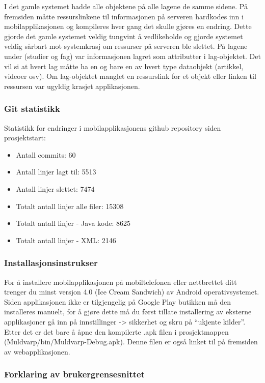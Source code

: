 \documentclass[../main.tex]{subfiles}
\begin{document}
I det gamle systemet hadde alle objektene på alle lagene de samme sidene. På fremsiden måtte ressurslinkene til informasjonen på serveren hardkodes inn i mobilapplikasjonen og kompileres hver gang det skulle gjøres en endring. Dette gjorde det gamle systemet veldig tungvint å vedlikeholde og gjorde systemet veldig sårbart mot systemkrasj om ressurser på serveren ble slettet. På lagene under (studier og fag) var informasjonen lagret som attributter i lag-objektet. Det vil si at hvert lag måtte ha en og bare en av hvert type dataobjekt (artikkel, videoer osv). Om lag-objektet manglet en ressurslink for et objekt eller linken til ressursen var ugyldig krasjet applikasjonen.

\subsubsection{Git statistikk}

Statistikk for endringer i mobilapplikasjonens github repository siden prosjektstart:
\begin{itemize}
\item Antall commits: 60
\item Antall linjer lagt til: 5513
\item Antall linjer slettet: 7474
\item Totalt antall linjer alle filer: 15308
\item Totalt antall linjer - Java kode: 8625
\item Totalt antall linjer - XML: 2146
\end{itemize}

\subsubsection{Installasjonsinstrukser}

For å installere mobilapplikasjonen på mobiltelefonen eller nettbrettet ditt trenger du minst versjon 4.0 (Ice Cream Sandwich) av Android operativsystemet. Siden applikasjonen ikke er tilgjengelig på Google Play butikken må den installeres manuelt, for å gjøre dette må du først tillate installering av eksterne applikasjoner gå inn på innstillinger -> sikkerhet og skru på “ukjente kilder”. Etter det er det bare å åpne den kompilerte .apk filen i prosjektmappen (Muldvarp/bin/Muldvarp-Debug.apk). Denne filen er også 
linket til på fremsiden av webapplikasjonen.

\subsubsection{Forklaring av brukergrensesnittet}
\end{document}
